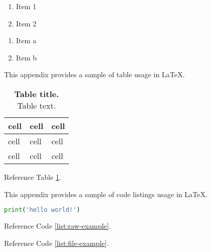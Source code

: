  \label{ordered-lists}

\begin{enumerate}
	\item Item 1
	\item Item 2
\end{enumerate}

 \label{alphabetical-list}

\begin{enumerate}[label=(\alph*)]
	\item Item a
	\item Item b
\end{enumerate}


 \label{tables}

This appendix provides a sample of table usage in LaTeX.

\begin{table}[H] \centering
\caption{\textbf{Table title.} Table text.}
\label{table:1}
\begin{tabular}{ p{2in} p{2in} p{2in} } 
	\toprule
	
	\textbf{cell} & \textbf{cell} & \textbf{cell} \\ 
	
	\midrule
	
	cell & cell & cell \\ 
	
	\midrule
	
	cell & cell & cell \\
	
	\bottomrule
\end{tabular}
\end{table}

Reference Table \ref{table:1}.


 \label{code-listings}

This appendix provides a sample of code listings usage in LaTeX.

 \label{raw-code}

\begin{lstlisting}[language=python, caption={Hello world example in Python}, label={list:raw-example}]
print('hello world!')
\end{lstlisting}

Reference Code \ref{list:raw-example}.

 \label{code-from-file}



Reference Code \ref{list:file-example}.
